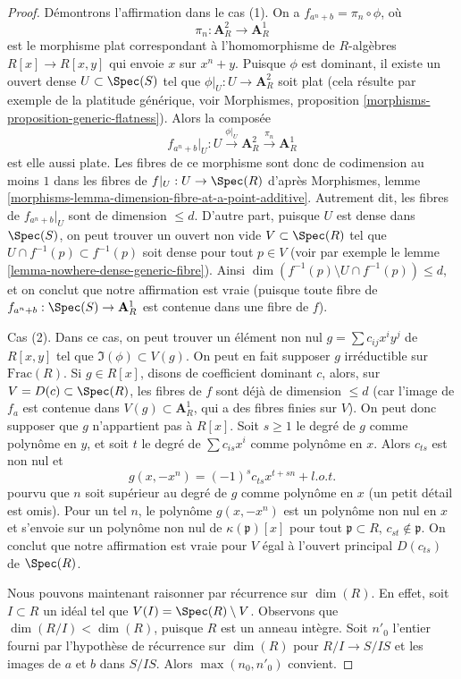 \begin{proof}
\medskip\noindent
Démontrons l'affirmation dans le cas (1). On a $f_{a^n + b} = \pi_n \circ \phi$,
où
$$
\pi_n :  \mathbf{A}^2_R \to \mathbf{A}^1_R
$$
est le morphisme plat correspondant à l'homomorphisme de $R$-algèbres $R[x] \to R[x, y]$
qui envoie $x$ sur $x^n + y$. Puisque $\phi$ est dominant, il existe un ouvert dense
$U \subset \Spec(S)$ tel que $\phi|_U : U \to \mathbf{A}^2_R$ soit plat
(cela résulte par exemple de la platitude générique, voir
Morphismes, proposition \ref{morphisms-proposition-generic-flatness}).
Alors la composée
$$
f_{a^n + b}|_U :
U \xrightarrow{\phi|_U}
\mathbf{A}^2_R
\xrightarrow{\pi_n}
\mathbf{A}^1_R
$$
est elle aussi plate. Les fibres de ce morphisme sont donc de codimension au moins
$1$ dans les fibres de $f|_U : U \to \Spec(R)$ d'après
Morphismes, lemme \ref{morphisms-lemma-dimension-fibre-at-a-point-additive}.
Autrement dit, les fibres de $f_{a^n + b}|_U$ sont de dimension $\leq d$.
D'autre part, puisque $U$ est dense dans $\Spec(S)$, on peut trouver un ouvert non vide
$V \subset \Spec(R)$ tel que $U \cap f^{-1}(p) \subset f^{-1}(p)$
soit dense pour tout $p \in V$ (voir par exemple le lemme
\ref{lemma-nowhere-dense-generic-fibre}).
Ainsi $\dim(f^{-1}(p) \setminus U \cap f^{-1}(p)) \leq d$, et
on conclut que notre affirmation est vraie (puisque toute fibre de
$f_{a^n + b} : \Spec(S) \to \mathbf{A}^1_R$
est contenue dans une fibre de $f$).

\medskip\noindent
Cas (2). Dans ce cas, on peut trouver un élément non nul $g = \sum c_{ij} x^i y^j$
de $R[x, y]$ tel que $\Im(\phi) \subset V(g)$. On peut en fait supposer
$g$ irréductible sur $\text{Frac}(R)$. Si $g \in R[x]$, disons de coefficient
dominant $c$, alors, sur $V = D(c) \subset \Spec(R)$, les fibres de
$f$ sont déjà de dimension $\leq d$ (car l'image de $f_a$ est contenue
dans $V(g) \subset \mathbf{A}^1_R$, qui a des fibres finies sur $V$). On peut donc
supposer que $g$ n'appartient pas à $R[x]$.
Soit $s \geq 1$ le degré de $g$ comme polynôme en $y$, et
soit $t$ le degré de $\sum c_{is} x^i$ comme polynôme en $x$.
Alors $c_{ts}$ est non nul et
$$
g(x, -x^n) = (-1)^s c_{ts} x^{t + sn} + l.o.t.
$$
pourvu que $n$ soit supérieur au degré de $g$ comme polynôme en $x$
(un petit détail est omis). Pour un tel $n$, le polynôme $g(x, -x^n)$ 
est un polynôme non nul en $x$ et s'envoie sur un polynôme non nul de
$\kappa(\mathfrak p)[x]$ pour tout $\mathfrak p \subset R$,
$c_{st} \not \in \mathfrak p$. On conclut que notre affirmation est
vraie pour $V$ égal à l'ouvert principal $D(c_{ts})$ de $\Spec(R)$.

\medskip\noindent
Nous pouvons maintenant raisonner par récurrence sur $\dim(R)$. En effet, soit
$I \subset R$ un idéal tel que $V(I) = \Spec(R) \setminus V$.
Observons que $\dim(R/I) < \dim(R)$, puisque $R$ est un anneau intègre.
Soit $n'_0$ l'entier fourni par l'hypothèse de récurrence sur $\dim(R)$
pour $R/I \to S/IS$ et les images de $a$ et $b$ dans $S/IS$.
Alors $\max(n_0, n'_0)$ convient.
\end{proof}

